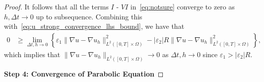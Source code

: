 \documentclass[10pt,letterpaper]{amsart}
\theoremstyle{definition}{\newtheorem{definition}[lemma]{Definition}}
\theoremstyle{note}{\newtheorem{claim}{Claim}[section]
\newtheorem*{claim*}{Claim}}
\numberwithin{equation}{section}
\begin{document}
\begin{proof}
It follows that all the terms $I$ - $VI$ in~\eqref{eq:notsure} converge to zero as $h,\Delta t\to 0$ up to subsequence.
Combining this with~\eqref{eq:u_strong_convergence_lhs_bound}, we have that
\begin{equation}
\begin{split}
0 &\ge \lim_{\Delta t,h\to 0} \left\{\varepsilon_1\|\nabla u - \nabla u_h\|_{L^2([0,T]\times\Omega)}^2 -\lvert\varepsilon_2\rvert R\|\nabla u - \nabla u_h\|_{L^2([0,T]\times\Omega)}^2\right\},
\end{split}
\end{equation}
which implies that $\|\nabla u-\nabla u_h\|_{L^2([0,T]\times\Omega)}\to 0$ as $\Delta t, h\to 0$ since $\varepsilon_1 > \lvert\varepsilon_2\rvert R$.

\medskip

\textbf{Step 4: Convergence of Parabolic Equation}


\end{proof}
\end{document}
